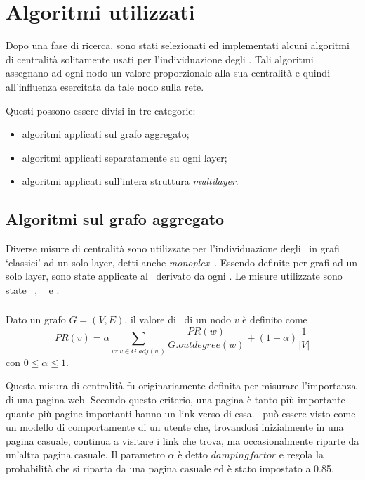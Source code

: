 \chapter{Algoritmi utilizzati}
Dopo una fase di ricerca, sono stati selezionati ed implementati alcuni algoritmi di centralità solitamente usati per 
l'individuazione degli \infsp. Tali algoritmi assegnano ad ogni nodo un valore proporzionale alla sua centralità e 
quindi all'influenza esercitata da tale nodo sulla rete.

Questi possono essere divisi in tre categorie:
\begin{itemize}
\item algoritmi applicati sul grafo aggregato;
\item algoritmi applicati separatamente su ogni layer;
\item algoritmi applicati sull'intera struttura \textit{multilayer}.
\end{itemize}

\section{Algoritmi sul grafo aggregato}
Diverse misure di centralità sono utilizzate per l'individuazione degli \infsp\ in grafi 
`classici' ad un solo layer, detti anche \textit{monoplex}~\cite{kitsak:infsp}\cite{basaras:infsp}\cite{pei:infsp}. 
Essendo definite per grafi ad un solo layer, sono state applicate al \gragg\
derivato da ogni \muln. 
Le misure utilizzate sono state \PageRank~\cite{page:pagerank}, 
\kcore~\cite{batagelj:kcore} e 
\degree.


\subsection{\PageRank}
\label{alg:pagerank}
\begin{definizione}[\PageRank]
    \label{def:pagerank}
    Dato un grafo $G=(V, E)$, il valore di \PageRank\ di un nodo $v$ è definito come
    \begin{equation}
        PR(v) = \alpha\sum_{w : v \in G.adj(w)}
        \frac{PR(w)}{G.outdegree(w)} + 
        (1-\alpha)\frac{1}{|V|}
    \end{equation}
    con $0 \le \alpha \le 1$.
\end{definizione}

Questa misura di centralità fu originariamente definita per misurare l'importanza di una pagina web. 
Secondo questo criterio, una pagina è tanto più importante quante più pagine importanti hanno un link 
verso di essa. 
\PageRank\ può essere visto come un modello di comportamente di un utente che, trovandosi inizialmente
in una pagina casuale, continua a visitare i link che trova, ma occasionalmente riparte da un'altra 
pagina casuale.
Il parametro $\alpha$ è detto $damping factor$ e regola la probabilità che si riparta da una pagina 
casuale ed è stato impostato a \num{0.85}.

